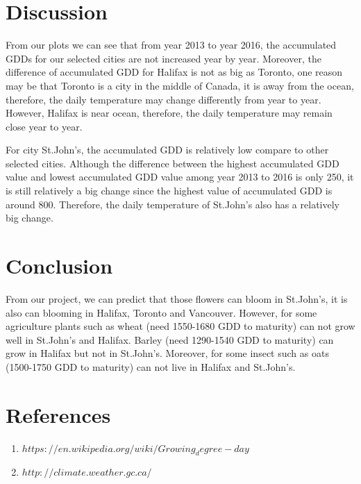 \documentclass[12pt]{article}
\begin{document}
\section{ \bf Discussion}
From our plots we can see that from year 2013 to year 2016, the accumulated GDDs for our selected cities are not increased year by year. Moreover, the difference of accumulated GDD for Halifax is not as big as Toronto, one reason may be that Toronto is a city in the middle of Canada, it is away from the ocean, therefore, the daily temperature may change differently from year to year. However, Halifax is near ocean, therefore, the daily temperature may remain close year to year. 

For city St.John's, the accumulated GDD is relatively low compare to other selected cities. Although the difference between the highest accumulated GDD value and lowest accumulated GDD value among year 2013 to 2016 is only 250, it is still relatively a big change since the highest value of accumulated GDD is around 800. Therefore, the daily temperature of St.John's also has a relatively big change.


\section{Conclusion}
From our project, we can predict that those flowers can bloom in St.John's, it is also can blooming in Halifax, Toronto and Vancouver. However, for some agriculture plants such as wheat (need 1550-1680 GDD to maturity) can not grow well in St.John's and Halifax. Barley (need 1290-1540 GDD to maturity) can grow in Halifax but not in St.John's. Moreover, for some insect such as oats (1500-1750 GDD to maturity) can not live in Halifax and St.John's.




\section{References}

\begin{enumerate}
\item \href{url}{$https://en.wikipedia.org/wiki/Growing_degree-day$}
\item \href{url}{$http://climate.weather.gc.ca/$}
\end{enumerate}
\end{document}
